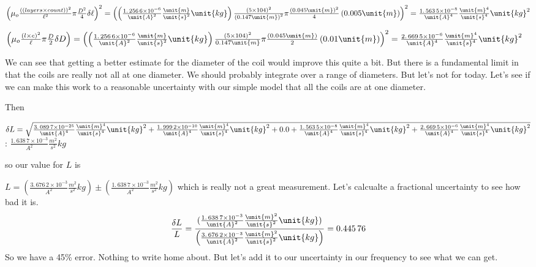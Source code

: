 \documentclass{sebase}
\begin{document}
$\left( \mu _{o}\frac{\left( \left( layers\times count\right) \right) ^{2}}{%
\ell ^{2}}\pi \frac{D^{2}}{4}\delta \ell \right) ^{2}=\left( \left(
\allowbreak \frac{1.\,\allowbreak 256\,6\times 10^{-6}}{\unit{A}^{2}}\frac{%
\unit{m}}{\unit{s}^{2}}\unit{kg}\right) \frac{\left( 5\times 104\right) ^{2}%
}{\left( 0.147\unit{m}\right) ^{2}}\pi \frac{\left( 0.045\unit{m}\right) ^{2}%
}{4}\left( 0.005\unit{m}\right) \right) ^{2}=\allowbreak \frac{%
1.\,\allowbreak 563\,5\times 10^{-8}}{\unit{A}^{4}}\frac{\unit{m}^{4}}{\unit{%
s}^{4}}\unit{kg}^{2}$

$\left( \mu _{o}\frac{\left( l\times c\right) ^{2}}{\ell }\pi \frac{D}{2}%
\delta D\right) =\left( \left( \allowbreak \frac{1.\,\allowbreak
256\,6\times 10^{-6}}{\unit{A}^{2}}\frac{\unit{m}}{\unit{s}^{2}}\unit{kg}%
\right) \frac{\left( 5\times 104\right) ^{2}}{0.147\unit{m}}\pi \frac{\left(
0.045\unit{m}\right) }{2}\left( 0.01\unit{m}\right) \right) ^{2}\allowbreak
=\allowbreak \frac{2.\,\allowbreak 669\,5\times 10^{-6}}{\unit{A}^{4}}\frac{%
\unit{m}^{4}}{\unit{s}^{4}}\unit{kg}^{2}$

We can see that getting a better estimate for the diameter of the coil would
improve this quite a bit. But there is a fundamental limit in that the coils
are really not all at one diameter. We should probably integrate over a
range of diameters. But let's not for today. Let's see if we can make this
work to a reasonable uncertainty with our simple model that all the coils
are at one diameter. 

Then 

$\delta L=\sqrt{\allowbreak \allowbreak \frac{3.\,\allowbreak 089\,7\times
10^{-25}}{\unit{A}^{4}}\frac{\unit{m}^{4}}{\unit{s}^{4}}\unit{kg}^{2}+\frac{%
1.\,\allowbreak 999\,2\times 10^{-10}}{\unit{A}^{4}}\frac{\unit{m}^{4}}{%
\unit{s}^{4}}\unit{kg}^{2}+\allowbreak 0.0+\frac{1.\,\allowbreak
563\,5\times 10^{-8}}{\unit{A}^{4}}\frac{\unit{m}^{4}}{\unit{s}^{4}}\unit{kg}%
^{2}+\frac{2.\,\allowbreak 669\,5\times 10^{-6}}{\unit{A}^{4}}\frac{\unit{m}%
^{4}}{\unit{s}^{4}}\unit{kg}^{2}}\allowbreak $ : $\frac{1.\,\allowbreak
638\,7\times 10^{-3}}{\unit{A}^{2}}\frac{\unit{m}^{2}}{\unit{s}^{2}}\unit{kg}
$

so our value for $L$ is 

$L=\left( \allowbreak \frac{3.\,\allowbreak 676\,2\times 10^{-3}}{\unit{A}%
^{2}}\frac{\unit{m}^{2}}{\unit{s}^{2}}\unit{kg}\right) \pm (\allowbreak
\allowbreak \allowbreak \allowbreak \frac{1.\,\allowbreak 638\,7\times
10^{-3}}{\unit{A}^{2}}\frac{\unit{m}^{2}}{\unit{s}^{2}}\unit{kg})$ which is
really not a great measurement. Let's calcualte a fractional uncertainty to
see how bad it is.%
\[
\frac{\delta L}{L}=\frac{(\frac{1.\,\allowbreak 638\,7\times 10^{-3}}{\unit{A%
}^{2}}\frac{\unit{m}^{2}}{\unit{s}^{2}}\unit{kg})}{\left( \allowbreak \frac{%
3.\,\allowbreak 676\,2\times 10^{-3}}{\unit{A}^{2}}\frac{\unit{m}^{2}}{\unit{%
s}^{2}}\unit{kg}\right) }=0.445\,76
\]
So we have a 45\% error. Nothing to write home about. But let's add it to
our uncertainty in our frequency to see what we can get.
\end{document}
